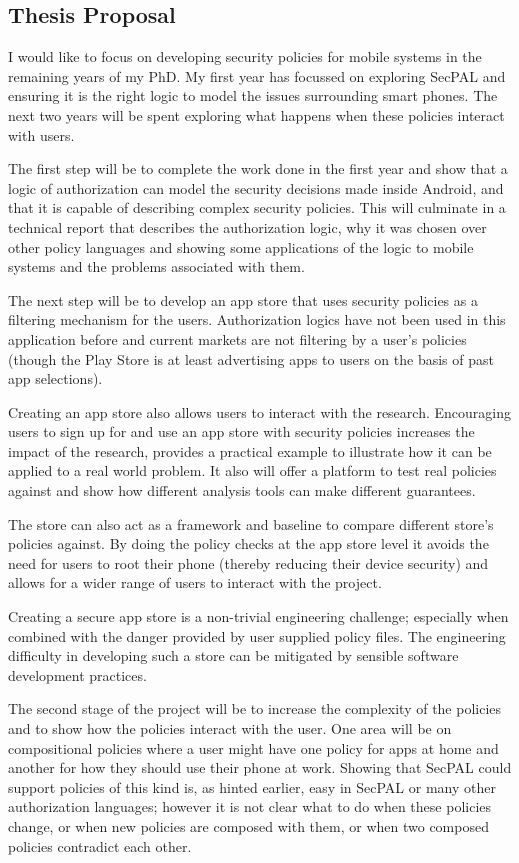 \documentclass[a4paper,sfsidenotes]{tufte-book}
\begin{document}
\subsection{Thesis Proposal}

I would like to focus on developing security policies for mobile systems in the
remaining years of my PhD.  My first year has focussed on exploring SecPAL
and ensuring it is the right logic to model the issues surrounding smart phones.
The next two years will be spent exploring what happens when these policies
interact with users.

The first step will be to complete the work done in the first year and show that
a logic of authorization can model the security decisions made inside Android,
and that it is capable of describing complex security policies.  This will
culminate in a technical report that describes the authorization logic, why it
was chosen over other policy languages and showing some applications of
the logic to mobile systems and the problems associated with them.

The next step will be to develop an app store that uses security policies as a
filtering mechanism for the users.  Authorization logics have not been used in
this application before and current markets are not filtering by a user's
policies (though the Play Store is at least advertising apps to users on the
basis of past app selections).

Creating an app store also allows users to interact with the research.
Encouraging users to sign up for and use an app store with security policies
increases the impact of the research, provides a practical example to illustrate
how it can be applied to a real world problem.  It also will offer a platform to
test real policies against and show how different analysis tools can make
different guarantees.  

The store can also act as a framework and baseline to compare different store's
policies against.  By doing the policy checks at the app store level it avoids
the need for users to root their phone (thereby reducing their device security)
and allows for a wider range of users to interact with the project. 

Creating a secure app store is a non-trivial engineering challenge; especially
when combined with the danger provided by user supplied policy files. The
engineering difficulty in developing such a store can be mitigated by sensible
software development practices. 

The second stage of the project will be to increase the complexity of the
policies and to show how the policies interact with the user.  One area will be
on compositional policies where a user might have one policy for apps at home
and another for how they should use their phone at work.  Showing that SecPAL
could support policies of this kind is, as hinted earlier, easy in SecPAL or
many other authorization languages; however it is
not clear what to do when these policies change, or when new policies are
composed with them, or when two composed policies contradict each other.
\end{document}
